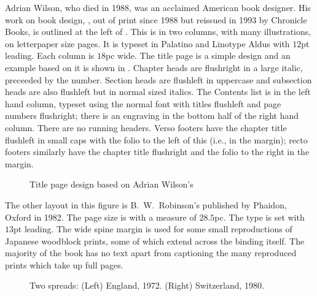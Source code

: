 \documentclass[10pt,letterpaper,extrafontsizes]{memoir}
\begin{document}
    Adrian Wilson, who died in 1988, was an 
acclaimed American book designer.
His work on book design, , out of print since
1988 but reissued in 1993 by Chronicle Books, is outlined
at the left of . This is in two columns, 
with many illustrations,
on letterpaper size pages. 
It is typeset in Palatino and 
Linotype Aldus 
with $12$pt leading. 
Each column is $18$pc wide. The title page is a simple design and an
example based on it is shown in . 
Chapter heads are 
flushright in a large italic, preceeded by the number. 
Section heads are flushleft in uppercase and 
subsection heads are also flushleft but in normal sized italics.
The Contents list is in the left hand column, typeset 
using the normal font with titles flushleft and page numbers flushright;
there is an engraving in the bottom half of the right hand column.
There are no running headers. Verso footers have the
chapter title flushleft in small caps with the folio
to the left of this (i.e., in the margin); recto footers similarly have
the chapter title flushright and the folio to the right in the margin.

\begin{figure}
\centering
\begin{showtitle}
\titleDB
\end{showtitle}
\caption{Title page design based on Adrian Wilson's } \label{fig:titleDB}
\end{figure}

The other layout in this
figure is B.~W.~Robinson's  published
by Phaidon, Oxford in 1982. The page size is  with a
measure of $28.5$pc. The type is set with $13$pt leading. The wide spine
margin is used for some small 
reproductions of Japanese 
woodblock prints, some of which extend across the binding itself. 
The majority of the book has no text apart from captioning the many 
reproduced prints which take up full pages.

\begin{figure}
\centering
\begin{minipage}[b]{\pwlayi}
\end{minipage}
\hfill
\begin{minipage}[b]{\pwlayi}
\end{minipage}
\caption[Two spreads: England, 1972 and Switzerland, 1980]%
        {Two spreads: (Left) England, 1972.
         (Right) Switzerland, 1980.} \label{fb:15}
\end{figure}
\end{document}
